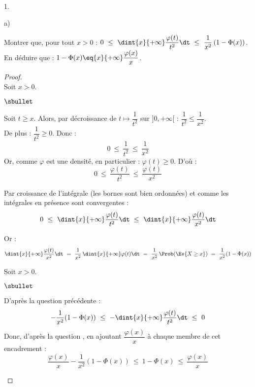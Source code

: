 \documentclass[11pt]{article}%
\begin{document}
\begin{noliste}{1.}
\begin{noliste}{a)}
    \item Montrer que, pour tout $x>0$ : $0 \ \leq \ \dint{x}{+\infty}  
    \dfrac{\varphi(t)}{t^2} \dt \ \leq \ \dfrac{1}{x^2}\, 
    (1-\Phi(x))$.\\
    En déduire que : $1-\Phi(x) \eq{x}{+\infty} 
    \dfrac{\varphi(x)}{x}$.
    
    \begin{proof}~\\
      Soit $x>0$.
      \begin{noliste}{$\sbullet$}
      \item Soit $t \geq x$. Alors, par décroissance de $t\mapsto 
      \dfrac{1}{t^2}$ sur $]0,+\infty[$ : $ \dfrac{1}{t^2} \leq 
      \dfrac{1}{x^2}$.\\
      De plus : $\dfrac{1}{t^2} \geq 0$. Donc : 
      \[
        0 \ \leq \ \dfrac{1}{t^2} \ \leq \ \dfrac{1}{x^2}
      \]
      Or, comme $\varphi$ est une densité, en particulier : 
      $\varphi(t) \geq 0$. D'où :
      \[
        0 \ \leq \ \dfrac{\varphi(t)}{t^2} \ \leq \ 
        \dfrac{\varphi(t)}{x^2}
      \]
      
    \item Par croissance de l'intégrale (les bornes sont bien
      ordonnées) et comme les intégrales en présence sont convergentes
      :
      \[
        0 \ \leq \ \dint{x}{+\infty} \dfrac{\varphi(t)}{t^2} \dt \
        \leq \ \dint{x}{+\infty} \dfrac{\varphi(t)}{x^2} \dt
      \]
      
      \item Or :
      \[
        \dint{x}{+\infty} \dfrac{\varphi(t)}{x^2} \dt \ = \
        \dfrac{1}{x^2} \, \dint{x}{+\infty} \varphi(t) \dt \ = \
        \dfrac{1}{x^2} \, \Prob(\Ev{X \geq x}) \ = \
        \dfrac{1}{x^2} (1-\Phi(x))
      \]
      \end{noliste}
      
      
      
      
      
      
      Soit $x>0$.
      \begin{noliste}{$\sbullet$}
	\item D'après la question précédente :
	\[
	  -\dfrac{1}{x^2}(1-\Phi(x)) \ \leq \ - \dint{x}{+\infty}
	  \dfrac{\varphi(t)}{t^2} \dt \ \leq \ 0
	\]
	Donc, d'après la question , en ajoutant $\dfrac{
	\varphi(x)}{x}$ à chaque membre de cet encadrement :
	\[
	  \dfrac{\varphi(x)}{x} - \dfrac{1}{x^2}(1-\Phi(x)) \ \leq \
	  1-\Phi(x) \ \leq \ \dfrac{\varphi(x)}{x}
	\]
	

\end{noliste}
\end{proof}
\end{noliste}
\end{noliste}
\end{document}
